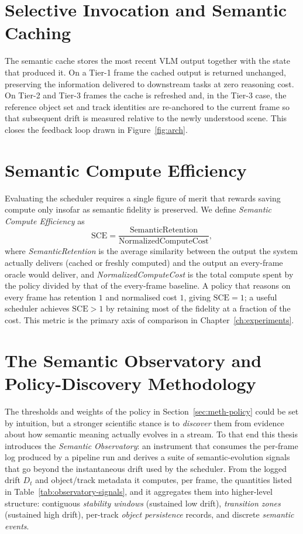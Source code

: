 \section{Selective Invocation and Semantic Caching}
\label{sec:meth-cache}

The semantic cache stores the most recent VLM output together with the state
that produced it. On a Tier-1 frame the cached output is returned unchanged,
preserving the information delivered to downstream tasks at zero reasoning
cost. On Tier-2 and Tier-3 frames the cache is refreshed and, in the Tier-3
case, the reference object set and track identities are re-anchored to the
current frame so that subsequent drift is measured relative to the
newly understood scene. This closes the feedback loop drawn in
Figure~\ref{fig:arch}.

\section{Semantic Compute Efficiency}
\label{sec:meth-sce}

Evaluating the scheduler requires a single figure of merit that rewards
saving compute only insofar as semantic fidelity is preserved. We define
\emph{Semantic Compute Efficiency} as
\begin{equation}
  \mathrm{SCE} = \frac{\text{SemanticRetention}}{\text{NormalizedComputeCost}},
  \label{eq:sce}
\end{equation}
where \emph{SemanticRetention} is the average similarity between the output
the system actually delivers (cached or freshly computed) and the output an
every-frame oracle would deliver, and \emph{NormalizedComputeCost} is the
total compute spent by the policy divided by that of the every-frame
baseline. A policy that reasons on every frame has retention $1$ and
normalised cost $1$, giving $\mathrm{SCE}=1$; a useful scheduler achieves
$\mathrm{SCE} > 1$ by retaining most of the fidelity at a fraction of the
cost. This metric is the primary axis of comparison in
Chapter~\ref{ch:experiments}.

\section{The Semantic Observatory and Policy-Discovery Methodology}
\label{sec:meth-observatory}

The thresholds and weights of the policy in Section~\ref{sec:meth-policy}
could be set by intuition, but a stronger scientific stance is to
\emph{discover} them from evidence about how semantic meaning actually evolves
in a stream. To that end this thesis introduces the \emph{Semantic
Observatory}: an instrument that consumes the per-frame log produced by a
pipeline run and derives a suite of semantic-evolution signals that go beyond
the instantaneous drift used by the scheduler. From the logged drift $D_t$ and
object/track metadata it computes, per frame, the quantities listed in
Table~\ref{tab:observatory-signals}, and it aggregates them into higher-level
structure: contiguous \emph{stability windows} (sustained low drift),
\emph{transition zones} (sustained high drift), per-track \emph{object
persistence} records, and discrete \emph{semantic events}.

